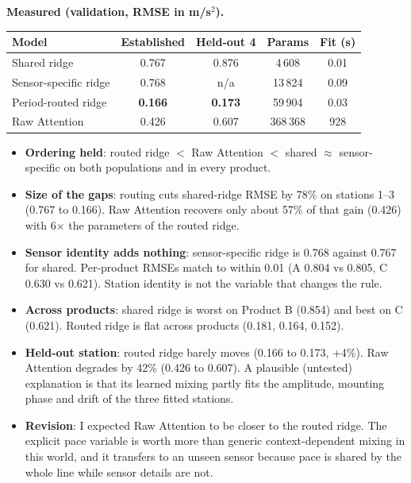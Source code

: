 \textbf{Measured (validation, RMSE in m/s$^2$).}

\begin{center}\small
\begin{tabular}{lcccc}
\toprule
Model & Established & Held-out 4 & Params & Fit (s)\\
\midrule
Shared ridge          & 0.767 & 0.876 & 4\,608 & 0.01\\
Sensor-specific ridge & 0.768 & n/a   & 13\,824 & 0.09\\
Period-routed ridge   & \textbf{0.166} & \textbf{0.173} & 59\,904 & 0.03\\
Raw Attention         & 0.426 & 0.607 & 368\,368 & 928\\
\bottomrule
\end{tabular}
\end{center}

\begin{itemize}
  \item \textbf{Ordering held}: routed ridge $<$ Raw Attention $<$ shared $\approx$
        sensor-specific on both populations and in every product.
  \item \textbf{Size of the gaps}: routing cuts shared-ridge RMSE by 78\% on stations
        1--3 (0.767 to 0.166). Raw Attention recovers only about 57\% of that gain
        (0.426) with 6$\times$ the parameters of the routed ridge.
  \item \textbf{Sensor identity adds nothing}: sensor-specific ridge is 0.768 against
        0.767 for shared. Per-product RMSEs match to within 0.01 (A 0.804 vs 0.805,
        C 0.630 vs 0.621). Station identity is not the variable that changes the rule.
  \item \textbf{Across products}: shared ridge is worst on Product B (0.854) and best on
        C (0.621). Routed ridge is flat across products (0.181, 0.164, 0.152).
  \item \textbf{Held-out station}: routed ridge barely moves (0.166 to 0.173, +4\%).
        Raw Attention degrades by 42\% (0.426 to 0.607). A plausible (untested)
        explanation is that its learned mixing partly fits the amplitude, mounting phase
        and drift of the three fitted stations.
  \item \textbf{Revision}: I expected Raw Attention to be closer to the routed ridge.
        The explicit pace variable is worth more than generic context-dependent mixing
        in this world, and it transfers to an unseen sensor because pace is shared by
        the whole line while sensor details are not.
\end{itemize}

